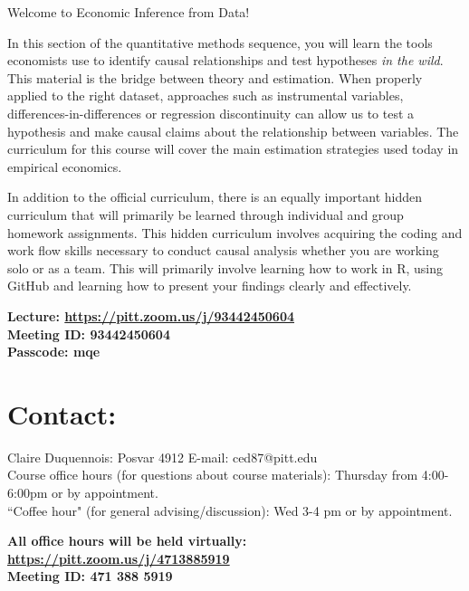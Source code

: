 \documentclass[a4paper, 10pt]{article}
\begin{document}
\begin{center}
Welcome to Economic Inference from Data!\\
\end{center}



In this section of the quantitative methods sequence, you will learn the tools economists use to identify causal relationships and test hypotheses \textit{in the wild}. This material is the bridge between theory and estimation. When properly applied to the right dataset, approaches such as instrumental variables, differences-in-differences or regression discontinuity can allow us to test a hypothesis and make causal claims about the relationship between variables. The curriculum for this course will cover the main estimation strategies used today in empirical economics. 

In addition to the official curriculum, there is an equally important hidden curriculum that will primarily be learned through individual and group homework assignments. This hidden curriculum involves acquiring the coding and work flow skills necessary to conduct causal analysis whether you are working solo or as a team. This will primarily involve learning how to work in R, using GitHub and learning how to present your findings clearly and effectively.



\noindent\textbf{Lecture: \href{ https://pitt.zoom.us/j/93442450604}{ https://pitt.zoom.us/j/93442450604}\\
Meeting ID:  93442450604\\
Passcode: mqe\\}


\section*{Contact:}


\normalsize \noindent Claire Duquennois: Posvar 4912  E-mail: ced87@pitt.edu\\
Course office hours (for questions about course materials): Thursday from 4:00-6:00pm or by appointment. \\
``Coffee hour" (for general advising/discussion): Wed 3-4 pm  or by appointment.

\noindent\textbf{All office hours will be held virtually: \href{https://pitt.zoom.us/j/4713885919}{https://pitt.zoom.us/j/4713885919}\\
Meeting ID: 471 388 5919\\}
\end{document}
